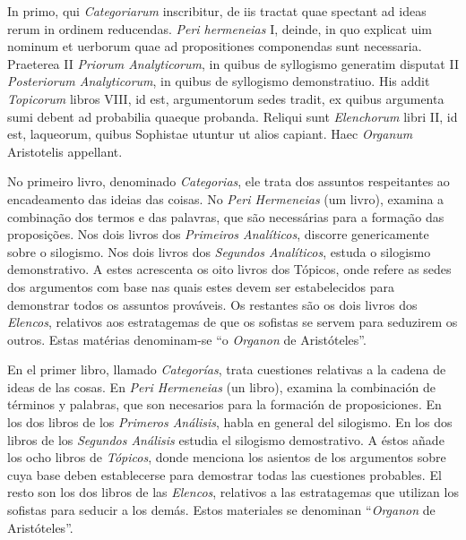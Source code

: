 \documentclass{article}
\begin{document}
\begin{paracol}{3}
\begin{nthcolumn}{2}
  \end{nthcolumn}
  \vspace{0.5cm}
  \begin{nthcolumn*}{0} %
    In primo, qui \emph{Categoriarum} inscribitur, de iis tractat quae spectant ad ideas rerum in ordinem reducendas. \emph{Peri hermeneias} I, deinde, in quo explicat uim nominum et uerborum quae ad propositiones componendas sunt necessaria. Praeterea II \emph{Priorum Analyticorum}, in quibus de syllogismo generatim disputat II \emph{Posteriorum Analyticorum}, in quibus de syllogismo demonstratiuo. His addit \emph{Topicorum} libros VIII, id est, argumentorum sedes tradit, ex quibus argumenta sumi debent ad probabilia quaeque probanda. Reliqui sunt \emph{Elenchorum} libri II, id est, laqueorum, quibus Sophistae utuntur ut alios capiant. Haec \emph{Organum} Aristotelis appellant.
  \end{nthcolumn*}
  \vspace{0.5cm}
  \begin{nthcolumn}{1} %
    No primeiro livro, denominado \emph{Categorias}, ele trata dos assuntos respeitantes ao encadeamento das ideias das coisas. No \emph{Peri Hermeneias} (um livro), examina a combinação dos termos e das palavras, que são necessárias para a formação das proposições. Nos dois livros dos \emph{Primeiros Analíticos}, discorre genericamente sobre o silogismo. Nos dois livros dos \emph{Segundos Analíticos}, estuda o silogismo demonstrativo. A estes acrescenta os oito livros dos Tópicos, onde refere as sedes dos argumentos com base nas quais estes devem ser estabelecidos para demonstrar todos os  assuntos prováveis. Os restantes são os dois livros dos \emph{Elencos}, relativos aos estratagemas de que os sofistas se servem para seduzirem os outros. Estas matérias denominam-se “o \emph{Organon} de Aristóteles”.
  \end{nthcolumn}
  \vspace{0.5cm}
  \begin{nthcolumn}{2} %
    En el primer libro, llamado \emph{Categorías}, trata cuestiones relativas a la cadena de ideas de las cosas. En \emph{Peri Hermeneias} (un libro), examina la combinación de términos y palabras, que son necesarios para la formación de proposiciones. En los dos libros de los \emph{Primeros Análisis}, habla en general del silogismo. En los dos libros de los \emph{Segundos Análisis} estudia el silogismo demostrativo. A éstos añade los ocho libros de \emph{Tópicos}, donde menciona los asientos de los argumentos sobre cuya base deben establecerse para demostrar todas las cuestiones probables. El resto son los dos libros de las \emph{Elencos}, relativos a las estratagemas que utilizan los sofistas para seducir a los demás. Estos materiales se denominan “\emph{Organon} de Aristóteles”.

\end{nthcolumn}
\end{paracol}
\end{document}
